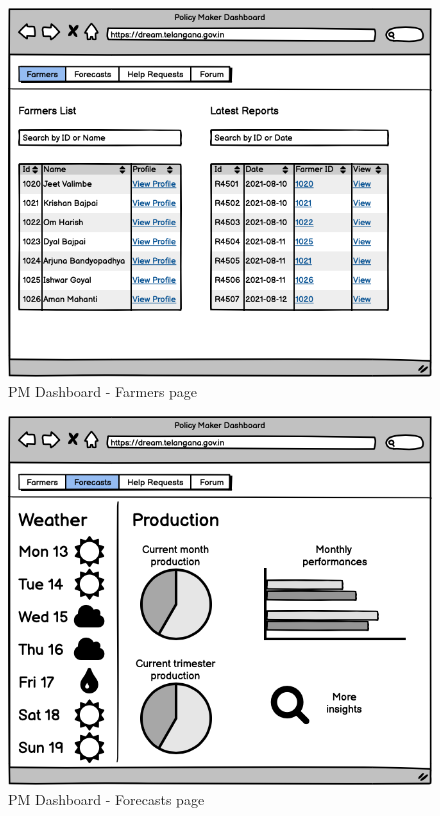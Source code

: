 \documentclass[10pt]{article}
\begin{document}
\begin{figure}[ht!]
    \centering
    \includegraphics[scale=0.40]{ui/pm_farmers.png}
    \caption{PM Dashboard - Farmers page}
\end{figure}
\begin{figure}[ht!]
    \centering
    \includegraphics[scale=0.40]{ui/pm_forecasts.png}
    \caption{PM Dashboard - Forecasts page}
\end{figure}
\end{document}

